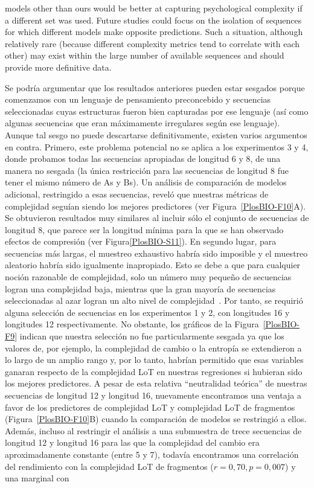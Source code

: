 models other than ours would be better at capturing psychological complexity if a different set was used. Future studies could focus on the isolation of sequences for which different models make opposite predictions. Such a situation, although relatively rare (because different complexity metrics tend to correlate with each other) may exist within the large number of available sequences and should provide more definitive data.

Se podría argumentar que los resultados anteriores pueden estar sesgados porque comenzamos con un lenguaje de pensamiento preconcebido y secuencias seleccionadas cuyas estructuras fueron bien capturadas por ese lenguaje (así como algunas secuencias que eran máximamente irregulares según ese lenguaje). Aunque tal sesgo no puede descartarse definitivamente, existen varios argumentos en contra. Primero, este problema potencial no se aplica a los experimentos 3 y 4, donde probamos todas las secuencias apropiadas de longitud 6 y 8, de una manera no sesgada (la única restricción para las secuencias de longitud 8 fue tener el mismo número de As y Bs). Un análisis de comparación de modelos adicional, restringido a esas secuencias, reveló que nuestras métricas de complejidad seguían siendo los mejores predictores (ver Figura~\ref{PlosBIO-F10}A). Se obtuvieron resultados muy similares al incluir sólo el conjunto de secuencias de longitud 8, que parece ser la longitud mínima para la que se han observado efectos de compresión (ver Figura\ref{PlosBIO-S11}). En segundo lugar, para secuencias más largas, el muestreo exhaustivo habría sido imposible y el muestreo aleatorio habría sido igualmente inapropiado. Esto se debe a que para cualquier noción razonable de complejidad, solo un número muy pequeño de secuencias logran una complejidad baja, mientras que la gran mayoría de secuencias seleccionadas al azar logran un alto nivel de complejidad~\cite{f43,li2013introduction}. Por tanto, se requirió alguna selección de secuencias en los experimentos 1 y 2, con longitudes 16 y longitudes 12 respectivamente. No obstante, los gráficos de la Figura~\ref{PlosBIO-F9} indican que nuestra selección no fue particularmente sesgada ya que los valores de, por ejemplo, la complejidad de cambio o la entropía se extendieron a lo largo de un amplio rango y, por lo tanto, habrían permitido que esas variables ganaran respecto de la complejidad LoT en nuestras regresiones si hubieran sido los mejores predictores. A pesar de esta relativa ``neutralidad teórica'' de nuestras secuencias de longitud 12 y longitud 16, nuevamente encontramos una ventaja a favor de los predictores de complejidad LoT y complejidad LoT de fragmentos (Figura~\ref{PlosBIO-F10}B) cuando la comparación de modelos se restringió a ellos. Además, incluso al restringir el análisis a una submuestra de trece secuencias de longitud 12 y longitud 16 para las que la complejidad del cambio era aproximadamente constante (entre 5 y 7), todavía encontramos una correlación del rendimiento con la complejidad LoT de fragmentos ($r = 0,70, p = 0,007$) y una marginal con 